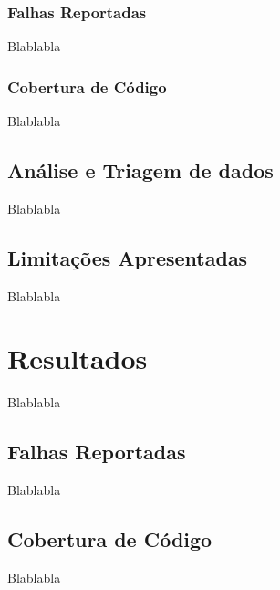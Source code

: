 \documentclass[11.5pt]{article}
\begin{document}
\subsubsection{Falhas Reportadas}
Blablabla

\subsubsection{Cobertura de Código}
Blablabla


\subsection{Análise e Triagem de dados}
Blablabla


\subsection{Limitações Apresentadas}
Blablabla




\section{Resultados}
Blablabla


\subsection{Falhas Reportadas}
Blablabla


\subsection{Cobertura de Código}
Blablabla
\end{document}
